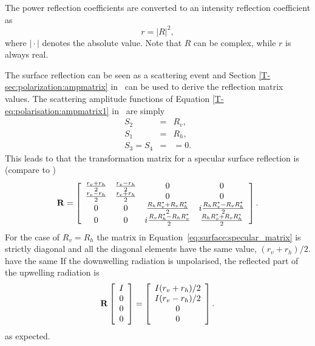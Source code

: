 The power reflection coefficients are converted to an intensity
 reflection coefficient as
 \begin{equation}
   \label{eq:surface:R2r}
   r = |R|^2,
 \end{equation}
 where $|\!\cdot\!|$ denotes the absolute value. Note that $R$ can be
 complex, while $r$ is always real.

The surface reflection can be seen as a scattering event and
Section \ref{T-sec:polarization:ampmatrix} in \theory\ can be used to derive the
reflection matrix values. The scattering amplitude functions of
Equation \ref{T-eq:polarisation:ampmatrix1} in \theory\ are simply
\begin{eqnarray}
  S_2 &=& R_v, \\
  S_1 &=& R_h, \\
  S_3 = S_4 &=& =0.
\end{eqnarray}
This leads to that the transformation matrix for a specular surface
reflection is (compare to \citet[Sec.\ 5.4.3]{liou:02})
\begin{equation}
  \label{eq:surface:specular_matrix}
  \mathbf{R} =
     \left[\begin{array}{cccc}
       \frac{r_v+r_h}{2}&\frac{r_v-r_h}{2}&0&0\\
       \frac{r_v-r_h}{2}&\frac{r_v+r_h}{2}&0&0\\
    0&0&\frac{R_hR_v^\ast+R_vR_h^\ast}{2}&i\frac{R_hR_v^\ast-R_vR_h^\ast}{2}\\
    0&0&i\frac{R_vR_h^\ast-R_hR_v^\ast}{2}&\frac{R_hR_v^\ast+R_vR_h^\ast}{2}\\
     \end{array}
     \right].
\end{equation}
For the case of $R_v=R_h$ the matrix in
Equation~\ref{eq:surface:specular_matrix} is strictly diagonal and all the
diagonal elements have the same value, $(r_v+r_h)/2$.
have the same  
If the downwelling radiation is unpolarised, the reflected part of the
upwelling radiation is
\begin{equation}
  \mathbf{R}
  \left[ \begin{array}{c} I\\0\\0\\0 \end{array} \right] =
  \left[ \begin{array}{c} I(r_v+r_h)/2\\I(r_v-r_h)/2\\0\\0 
  \end{array} \right].
\end{equation}
as expected.


